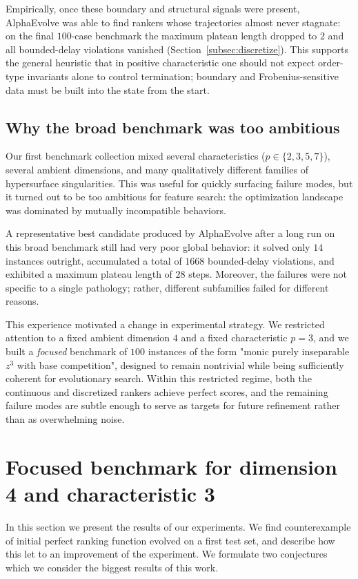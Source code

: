 \documentclass[11pt]{amsart}
\begin{document}
Empirically, once these boundary and structural signals were present, AlphaEvolve was able to find
rankers whose trajectories almost never stagnate: on the final $100$-case benchmark the maximum plateau
length dropped to $2$ and all bounded-delay violations vanished (Section~\ref{subsec:discretize}).
This supports the general heuristic that in positive characteristic one should not expect order-type
invariants alone to control termination; boundary and Frobenius-sensitive data must be built into the
state from the start.

\subsection{Why the broad benchmark was too ambitious}
\label{sec:toobroad}
Our first benchmark collection mixed several characteristics ($p\in\{2,3,5,7\}$), several ambient
dimensions, and many qualitatively different families of hypersurface singularities. 
This was useful for quickly surfacing failure modes, but it turned out to be too ambitious for
feature search: the optimization landscape was dominated by mutually incompatible behaviors.

A representative best candidate produced by AlphaEvolve after a long run on this broad benchmark
still had very poor global behavior:
it solved only $14$ instances outright, accumulated a total of $1668$ bounded-delay violations,
and exhibited a maximum plateau length of $28$ steps.
Moreover, the failures were not specific to a single pathology; rather, different subfamilies
failed for different reasons.

This experience motivated a change in experimental strategy.
We restricted attention to a fixed ambient dimension $4$ and a fixed characteristic $p=3$,
and we built a \emph{focused} benchmark of $100$ instances of the form "monic purely inseparable
$z^3$ with base competition", designed to remain nontrivial while being sufficiently coherent for
evolutionary search.
Within this restricted regime, both the continuous and discretized rankers achieve perfect scores, and the remaining failure modes are subtle enough to serve as
targets for future refinement rather than as overwhelming noise.

\section{Focused benchmark for dimension 4 and characteristic 3}\label{sec:results}

In this section we present the results of our experiments. We find counterexample of initial perfect ranking function evolved on a first test set, and describe how this let to an improvement of the experiment. We formulate two conjectures which we consider the biggest results of this work.  
\end{document}
